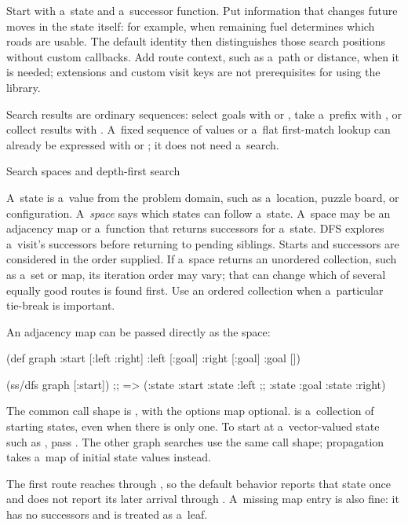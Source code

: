 Start with a~state and a~successor function. Put information that changes
future moves in the state itself: for example,  when
remaining fuel determines which roads are usable. The default identity then
distinguishes those search positions without custom callbacks.
Add route context, such as a~path or distance, when it is needed; extensions
and custom visit keys are not prerequisites for using the library.

Search results are ordinary sequences: select goals with  or
, take a~prefix with , or collect results with
. A~fixed sequence of values or a~flat first-match lookup can
already be expressed with  or ; it does not
need a~search.

\secc Search spaces and depth-first search

A~state is a~value from the problem domain, such as a~location, puzzle board,
or configuration. A~{\it space} says which states can follow a~state. A~space
may be an adjacency map or a~function that returns successors for a~state.
DFS explores a~visit's successors before returning to pending siblings.
Starts and successors are considered in the order supplied. If a~space
returns an unordered collection, such as a~set or map, its iteration order
may vary; that can change which of several equally good routes is found
first. Use an ordered collection when a~particular tie-break is important.

An adjacency map can be passed directly as the space:

\begtt {}
(def graph
  {:start [:left :right]
   :left  [:goal]
   :right [:goal]
   :goal  []})

(ss/dfs graph [:start])
;; => ({:state :start} {:state :left}
;;     {:state :goal} {:state :right})
\endtt

The common call shape is , with the
options map optional.  is a~collection of starting states, even
when there is only one. To start at a~vector-valued state such as
\code{[0 0]}, pass \code{[[0 0]]}. The other graph searches use the same
call shape; propagation takes a~map of initial state values instead.

The first route reaches  through , so the default
behavior reports that state once and does not report its later arrival
through . A~missing map entry is also fine: it has no
successors and is treated as a~leaf.


